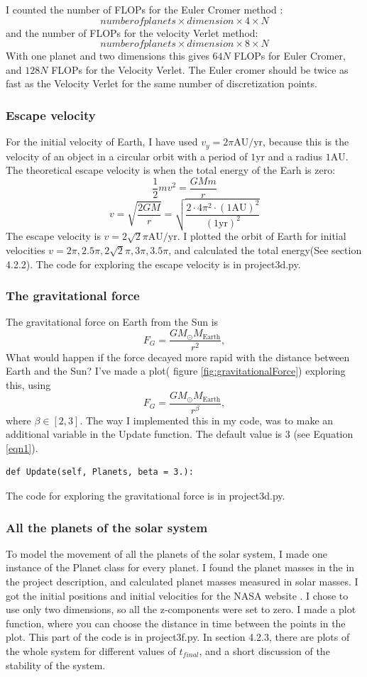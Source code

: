 \documentclass{article}
\begin{document}
I counted the number of FLOPs for the Euler Cromer method : $$number of planets \times dimension \times 4 \times N$$
and the number of FLOPs for the velocity Verlet method:
$$number of planets \times dimension \times 8 \times N$$
With one planet and two dimensions this gives $64N$ FLOPs for Euler Cromer, and $128N$ FLOPs for the Velocity Verlet. The Euler cromer should be twice as fast as the Velocity Verlet for the same number of discretization points.
\subsubsection{Escape velocity}
For the initial velocity of Earth, I have used $v_y=2\pi \textrm{AU} / \textrm{yr}$, because this is the velocity of an object in a circular orbit with a period of $1 \textrm{yr}$ and a radius $1 \textrm{AU}$. The theoretical escape velocity is when the total energy of the Earh is zero:
$$\frac{1}{2}mv^2=\frac{GMm}{r}$$ 
$$v= \sqrt{\frac{2GM}{r}}= \sqrt{ \frac{2\cdot 4 {\pi}^2 \cdot (1\textrm{AU})^2}{(1 \textrm{yr})^2}}$$
The escape velocity is $v=2 \sqrt{2}\pi \textrm{AU} / \textrm{yr}$. I plotted the orbit of Earth for initial velocities $v=2\pi, 2.5\pi, 2 \sqrt{2}\pi, 3\pi, 3.5\pi$, and calculated the total energy(See section 4.2.2). 
The code for exploring the escape velocity is in project3d.py.
\subsubsection{The gravitational force}
The gravitational force on Earth from the Sun is $$
F_G=\frac{GM_{\odot}M_{\mathrm{Earth}}}{r^2},
$$
What would happen if the force decayed more rapid with the distance between Earth and the Sun? I've made a plot( figure \ref{fig:gravitationalForce}) exploring this, using  
\[
F_G=\frac{GM_{\odot}M_{\mathrm{Earth}}}{r^{\beta}},
\]
where $\beta\in [2,3]$. The way I implemented this in my code, was to make an additional variable in the Update function. The default value is 3 (see Equation \ref{eqn1}). 
\begin{verbatim}
def Update(self, Planets, beta = 3.):
\end{verbatim}
The code for exploring the gravitational force is in project3d.py.

\subsubsection{All the planets of the solar system}
To model the movement of all the planets of the solar system, I made one instance of the Planet class for every planet. I found the planet masses in the  in the project description\cite{Projectdescription}, and calculated planet masses measured in solar masses. I got the initial positions and initial velocities for the NASA website \cite{NASA}. I chose to use only two dimensions, so all the z-components were set to zero. I made a plot function, where you can choose the distance in time between the points in the plot. This part of the code is in project3f.py.  In section 4.2.3, there are plots of the whole system for different values of $t_{final}$, and a short discussion of the stability of the system.  
\end{document}
